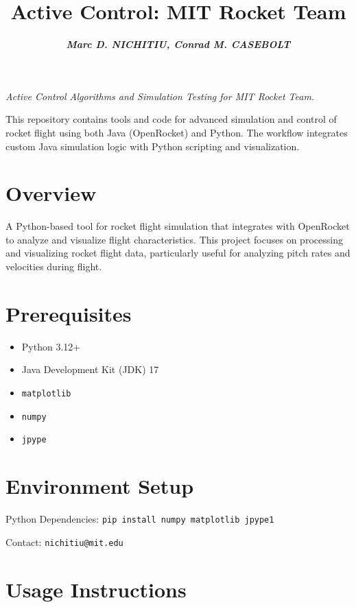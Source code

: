 \documentclass{amsdtx}
\title{\sc Active Control: MIT Rocket Team}
\author{\small \textbf{\textit{Marc D. NICHITIU, Conrad M. CASEBOLT}}}
\date{}
\providecommand{\tightlist}{%
  \setlength{\itemsep}{0pt}\setlength{\parskip}{0pt}}
\begin{document}
\maketitle

\begin{center}
\textit{Active Control Algorithms and Simulation Testing for MIT Rocket
Team.}
\end{center}

This repository contains tools and code for advanced simulation and
control of rocket flight using both Java (OpenRocket) and Python. The
workflow integrates custom Java simulation logic with Python scripting
and visualization.

\section{Overview}\label{overview}

A Python-based tool for rocket flight simulation that integrates with
OpenRocket to analyze and visualize flight characteristics. This project
focuses on processing and visualizing rocket flight data, particularly
useful for analyzing pitch rates and velocities during flight.

\section{Prerequisites}\label{prerequisites}

\begin{itemize}
\tightlist
\item
  Python 3.12+
\item
  Java Development Kit (JDK) 17
\item
  \texttt{matplotlib}
\item
  \texttt{numpy}
\item
  \texttt{jpype}
\end{itemize}

\section{Environment Setup}\label{environment-setup}

Python Dependencies:
\texttt{pip\ install\ numpy\ matplotlib\ jpype1}

Contact: \verb|nichitiu@mit.edu|

\section{Usage Instructions}
\end{document}
